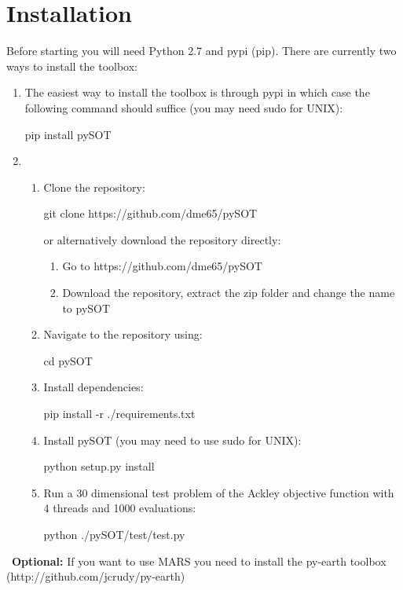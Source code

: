 \documentclass[]{article}
\begin{document}
\section{Installation}
Before starting you will need Python 2.7 and pypi (pip).  There are currently two ways to install the toolbox:
\begin{enumerate}
\item The easiest way to install the toolbox is through pypi in which case the following command should suffice (you may need sudo for UNIX):
\begin{python}
pip install pySOT
\end{python}
\item 
\begin{enumerate}
\item Clone the repository: 
\begin{python}
git clone https://github.com/dme65/pySOT
\end{python} 
or alternatively download the repository directly:
\begin{enumerate}
\item Go to https://github.com/dme65/pySOT
\item Download the repository, extract the zip folder and change the name to pySOT
\end{enumerate}
\item Navigate to the repository using:
\begin{python}
cd pySOT
\end{python} 
\item Install dependencies:
\begin{python}
pip install -r ./requirements.txt
\end{python} 
\item Install pySOT (you may need to use sudo for UNIX):
\begin{python}
python setup.py install
\end{python} 
\item Run a 30 dimensional test problem of the Ackley objective function with 4 threads and 1000 evaluations: 
\begin{python}
python ./pySOT/test/test.py
\end{python}
\end{enumerate}
\end{enumerate}
\ \newline \textbf{Optional: } If you want to use MARS you need to install the py-earth toolbox (http://github.com/jcrudy/py-earth)  
\end{document}
